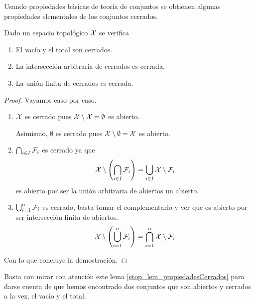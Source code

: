 Usando propiedades básicas de teoría de conjuntos se obtienen algunas propiedades elementales de los conjuntos cerrados.
\begin{lem}
	\label{etop_lem_propiedadesCerrados}
	Dado un espacio topológico $\mathcal{X}$ se verifica
	\begin{enumerate}
		\item El vacío y el total son cerrados.
		\item La intersección arbitraria de cerrados es cerrada.
		\item La unión finita de cerrados es cerrada.
	\end{enumerate}
\end{lem}
\begin{proof}Vayamos caso por caso.
	\begin{enumerate}
		\item $\mathcal{X}$ es cerrado pues $\mathcal{X}\setminus\mathcal{X}=\emptyset$ es abierto.
		
		Asimismo, $\emptyset$ es cerrado pues $\mathcal{X}\setminus\emptyset=\mathcal{X}$ es abierto.
		\item $\bigcap_{i\in I}\mathcal{F}_i$ es cerrado ya que
		\begin{equation*}
			\mathcal{X}\setminus\left(\bigcap_{i\in I}\mathcal{F}_i\right)=\bigcup_{i\in I}\mathcal{X}\setminus\mathcal{F}_i
		\end{equation*}
		es abierto por ser la unión arbitraria de abiertos un abierto.
		\item $\bigcup_{i=1}^n\mathcal{F}_i$ es cerrado, basta tomar el complementario y ver que es abierto por ser intersección finita de abiertos.
		\begin{equation*}
			\mathcal{X}\setminus\left(\bigcup_{i=1}^{n}\mathcal{F}_i\right)=\bigcap_{i=1}^n\mathcal{X}\setminus\mathcal{F}_i
		\end{equation*}
	\end{enumerate}
	Con lo que concluye la demostración.
\end{proof}
\begin{obs}
	\label{etop_obs_abiertoCerrado}
	Basta con mirar con atención este lema \ref{etop_lem_propiedadesCerrados} para darse cuenta de que hemos encontrado dos conjuntos que son abiertos y cerrados a la vez, el vacío y el total.
\end{obs}
